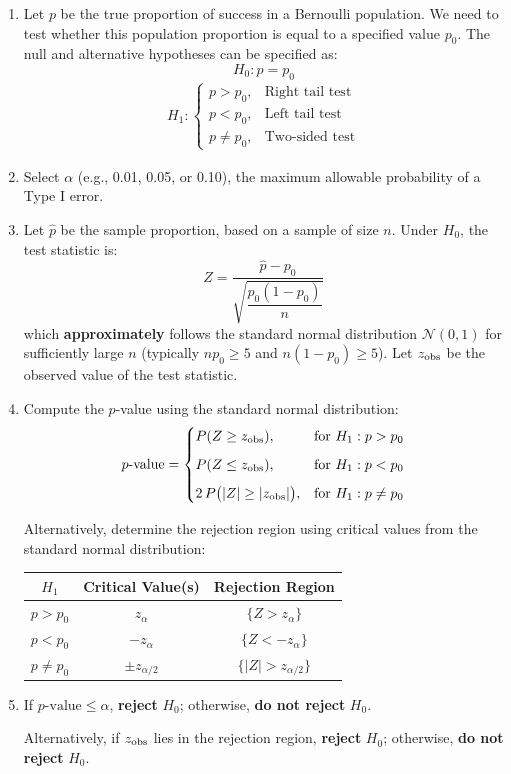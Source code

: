 \documentclass[twoside]{book}
\begin{document}
\begin{enumerate}
	\item Let \(p\) be the true proportion of success in a Bernoulli population. We need to test whether this population proportion is equal to a specified value \(p_0\). The null and alternative hypotheses can be specified as:
	\[
	H_0: p = p_0
	\]
	\begin{align*}
	H_1: \begin{cases}
	p > p_0, & \text{Right tail test}\\[6pt]
	p < p_0, & \text{Left tail test}\\[6pt]
	p \neq p_0, & \text{Two-sided test}
	\end{cases}
	\end{align*}

	\item Select \(\alpha\) (e.g., 0.01, 0.05, or 0.10), the maximum allowable probability of a Type I error.

	\item Let \(\hat{p}\) be the sample proportion, based on a sample of size \(n\). Under \(H_0\), the test statistic is:
	\[
	Z = \frac{\hat{p} - p_0}{\sqrt{\dfrac{p_0(1 - p_0)}{n}}}
	\]
	which \textbf{approximately} follows the standard normal distribution \(\mathcal{N}(0,1)\) for sufficiently large \(n\) (typically \(np_0 \ge 5\) and \(n(1-p_0) \ge 5\)). Let \(z_{\rm obs}\) be the observed value of the test statistic.

	\item Compute the \(p\)-value using the standard normal distribution:
	\[
	p\text{-value} =
	\begin{cases}
	P(Z \ge z_{\rm obs}), & \text{for } H_1: p > p_0 \\[6pt]
	P(Z \le z_{\rm obs}), & \text{for } H_1: p < p_0 \\[6pt]
	2\,P\bigl(|Z| \ge |z_{\rm obs}|\bigr), & \text{for } H_1: p \neq p_0
	\end{cases}
	\]

	Alternatively, determine the rejection region using critical values from the standard normal distribution:

	\begin{table}[H]
		\centering
		\begin{tabular}{@{}c|c|c@{}}
			\toprule
			\textbf{$H_1$} & \textbf{Critical Value(s)} & \textbf{Rejection Region} \\
			\midrule
			\(p > p_0\) & \(z_{\alpha}\) & \(\{Z > z_{\alpha}\}\) \\[6pt]
			\(p < p_0\) & \(-z_{\alpha}\) & \(\{Z < -z_{\alpha}\}\) \\[6pt]
			\(p \neq p_0\) & \(\pm z_{\alpha/2}\) & \(\{|Z| > z_{\alpha/2}\}\) \\
			\bottomrule
		\end{tabular}
	\end{table}

	\item If \(p\text{-value} \le \alpha\), \textbf{reject} \(H_0\); otherwise, \textbf{do not reject} \(H_0\).

	Alternatively, if \(z_{\rm obs}\) lies in the rejection region, \textbf{reject} \(H_0\); otherwise, \textbf{do not reject} \(H_0\).
\end{enumerate}
\end{document}
